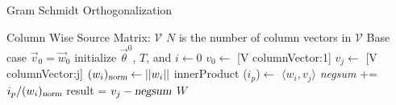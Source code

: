 \documentclass[11pt]{article}
\begin{document}
\begin{algorithm}
\caption{Gram Schmidt Orthogonalization}
\label{alg:gso}
\begin{algorithmic}
	\REQUIRE Column Wise Source Matrix: $\mathcal{V}$
	\STATE $N$ is the number of column vectors in $\mathcal{V}$
	\STATE Base case $\vec{v}_0 = \vec{w}_0$ 
	\STATE initialize $\vec{\theta}^0$, $T$, and $i \leftarrow 0$
	\STATE $v_0 \leftarrow $ [V columnVector:1]
		\STATE $v_j \leftarrow$ [V columnVector:j]
			\STATE $(w_i)_{\textsl{norm}} \leftarrow ||w_i ||$  
			\STATE innerProduct ($i_p$)$\leftarrow$ $\langle w_i , v_j \rangle$
			\STATE \textsl{negsum} += $i_p / (w_i)_{\textsl{norm}}$
		\ENDFOR
		\STATE result = $v_j - \textsl{negsum}$
	\ENDFOR
	\ENSURE $W$
\end{algorithmic}
\end{algorithm}
\end{document}
